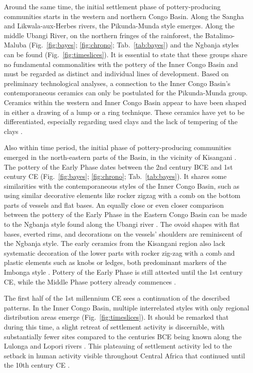 \documentclass[smallextended,natbib]{svjour3}       %
\begin{document}
Around the same time, the initial settlement phase of pottery-producing communities starts in the western and northern Congo Basin. Along the Sangha and Likwala-aux-Herbes rivers, the Pikunda-Munda style emerges. Along the middle Ubangi River, on the northern fringes of the rainforest, the Batalimo-Maluba (Fig.~\ref{fig:bayes}; \ref{fig:chrono}; Tab.~\ref{tab:bayes}) and the Ngbanja styles can be found (Fig.~\ref{fig:timeslices}). It is essential to state that these groups share no fundamental commonalities with the pottery of the Inner Congo Basin and must be regarded as distinct and individual lines of development. Based on preliminary technological analyses, a connection to the Inner Congo Basin's contemporaneous ceramics can only be postulated for the Pikunda-Munda group. Ceramics within the western and Inner Congo Basin appear to have been shaped in either a drawing of a lump or a ring technique. These ceramics have yet to be differentiated, especially regarding used clays and the lack of tempering of the clays \citep{Seidensticker.2020}. 

Also within time period, the initial phase of pottery-producing communities emerged in the north-eastern parts of the Basin, in the vicinity of Kisangani \citep[Fig.~\ref{fig:timeslices};][]{LivingstoneSmith.2017}. The pottery of the Early Phase dates between the 2nd century BCE and 1st century CE (Fig.~\ref{fig:bayes}; \ref{fig:chrono}; Tab.~\ref{tab:bayes}). It shares some similarities with the contemporaneous styles of the Inner Congo Basin, such as using similar decorative elements like rocker zigzag with a comb on the bottom parts of vessels and flat bases. An equally close or even closer comparison between the pottery of the Early Phase in the Eastern Congo Basin can be made to the Ngbanja style found along the Ubangi river \citep[204--205]{Seidensticker.2021e}. The ovoid shapes with flat bases, everted rims, and decorations on the vessels’ shoulders are reminiscent of the Ngbanja style. The early ceramics from the Kisangani region also lack systematic decoration of the lower parts with rocker zig-zag with a comb and plastic elements such as knobs or ledges, both predominant markers of the Imbonga style \citep[59--68]{Wotzka.1995}. Pottery of the Early Phase is still attested until the 1st century CE, while the Middle Phase pottery already commences \citep[Fig.~\ref{fig:bayes}; \ref{fig:chrono}; Tab.~\ref{tab:bayes};][]{LivingstoneSmith.2017}.

The first half of the 1st millennium CE sees a continuation of the described patterns. In the Inner Congo Basin, multiple interrelated styles with only regional distribution areas emerge (Fig.~\ref{fig:timeslices}). It should be remarked that during this time, a slight retreat of settlement activity is discernible, with substantially fewer sites compared to the centuries BCE being known along the Lulonga and Lopori rivers \citep[224]{Seidensticker.2021e}. This plateauing of settlement activity led to the setback in human activity visible throughout Central Africa that continued until the 10th century CE \citep{Seidensticker.2021}.
\end{document}
